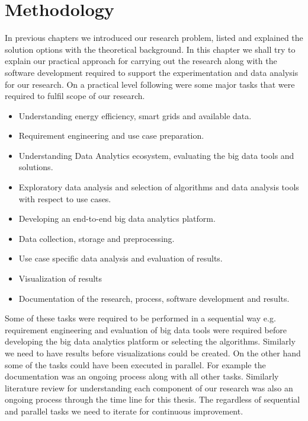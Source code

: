 \chapter{Methodology}\label{method}
\label{Methodology}
In previous chapters we introduced our research problem, listed and explained the solution options with the theoretical background. In this chapter we shall try to explain our practical approach for carrying out the research along with the software development required to support the experimentation and data analysis for our research. On a practical level following were some major tasks that were required to fulfil scope of our research.
\begin{itemize}
\item Understanding energy efficiency, smart grids and available data.
\item Requirement engineering and use case preparation.
\item Understanding Data Analytics ecosystem, evaluating the big data tools and solutions.
\item Exploratory data analysis and selection of algorithms and data analysis tools with respect to use cases. 
\item Developing an end-to-end big data analytics platform.
\item Data collection, storage and preprocessing.
\item Use case specific data analysis and evaluation of results.
\item Visualization of results 
\item Documentation of the research, process, software development and results.
\end{itemize}
Some of these tasks were required to be performed in a sequential way e.g. requirement engineering and evaluation of big data tools were required before developing the big data analytics platform or selecting the algorithms. Similarly we need to have results before visualizations could be created. On the other hand some of the tasks could have been executed in parallel. For example the documentation was an ongoing process along with all other tasks. Similarly literature review for understanding each component of our research was also an ongoing process through the time line for this thesis. The regardless of sequential and parallel tasks we need to iterate for continuous improvement.

